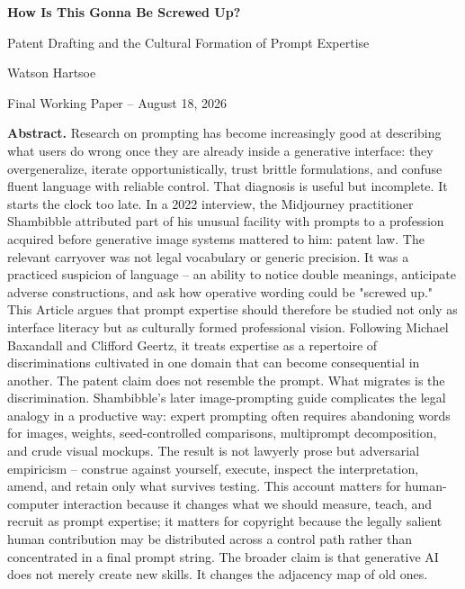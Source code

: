 \documentclass[11pt]{article}
\begin{document}
\begin{titlepage}
\thispagestyle{empty}
\vspace*{0.6in}
{\Large\bfseries How Is This Gonna Be Screwed Up?\par}
\vspace{0.2em}
{\large Patent Drafting and the Cultural Formation of Prompt Expertise\par}
\vspace{1.1em}
{\normalsize Watson Hartsoe\par}
{\small Final Working Paper -- August 18, 2026\par}
\vspace{1.4em}

\textbf{Abstract.} Research on prompting has become increasingly good at describing what users do wrong once they are already inside a generative interface: they overgeneralize, iterate opportunistically, trust brittle formulations, and confuse fluent language with reliable control. That diagnosis is useful but incomplete. It starts the clock too late. In a 2022 interview, the Midjourney practitioner Shambibble attributed part of his unusual facility with prompts to a profession acquired before generative image systems mattered to him: patent law. The relevant carryover was not legal vocabulary or generic precision. It was a practiced suspicion of language -- an ability to notice double meanings, anticipate adverse constructions, and ask how operative wording could be "screwed up." This Article argues that prompt expertise should therefore be studied not only as interface literacy but as culturally formed professional vision. Following Michael Baxandall and Clifford Geertz, it treats expertise as a repertoire of discriminations cultivated in one domain that can become consequential in another. The patent claim does not resemble the prompt. What migrates is the discrimination. Shambibble's later image-prompting guide complicates the legal analogy in a productive way: expert prompting often requires abandoning words for images, weights, seed-controlled comparisons, multiprompt decomposition, and crude visual mockups. The result is not lawyerly prose but adversarial empiricism -- construe against yourself, execute, inspect the interpretation, amend, and retain only what survives testing. This account matters for human-computer interaction because it changes what we should measure, teach, and recruit as prompt expertise; it matters for copyright because the legally salient human contribution may be distributed across a control path rather than concentrated in a final prompt string. The broader claim is that generative AI does not merely create new skills. It changes the adjacency map of old ones.


\end{titlepage}
\end{document}
